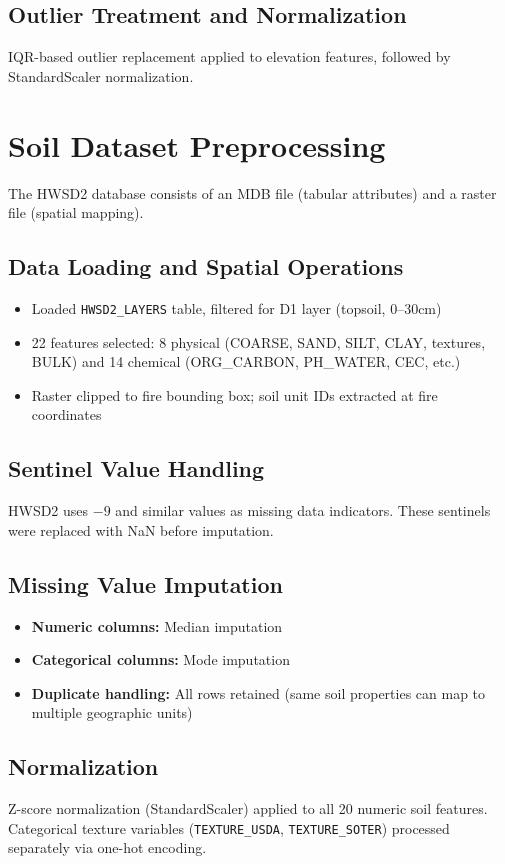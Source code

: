 \subsection{Outlier Treatment and Normalization}
IQR-based outlier replacement applied to elevation features, followed by StandardScaler normalization.

\section{Soil Dataset Preprocessing}

The HWSD2 database consists of an MDB file (tabular attributes) and a raster file (spatial mapping).

\subsection{Data Loading and Spatial Operations}
\begin{itemize}
    \item Loaded \texttt{HWSD2\_LAYERS} table, filtered for D1 layer (topsoil, 0--30cm)
    \item 22 features selected: 8 physical (COARSE, SAND, SILT, CLAY, textures, BULK) and 14 chemical (ORG\_CARBON, PH\_WATER, CEC, etc.)
    \item Raster clipped to fire bounding box; soil unit IDs extracted at fire coordinates
\end{itemize}

\subsection{Sentinel Value Handling}
HWSD2 uses $-9$ and similar values as missing data indicators. These sentinels were replaced with NaN before imputation.

\subsection{Missing Value Imputation}
\begin{itemize}
    \item \textbf{Numeric columns:} Median imputation
    \item \textbf{Categorical columns:} Mode imputation
    \item \textbf{Duplicate handling:} All rows retained (same soil properties can map to multiple geographic units)
\end{itemize}

\subsection{Normalization}
Z-score normalization (StandardScaler) applied to all 20 numeric soil features. Categorical texture variables (\texttt{TEXTURE\_USDA}, \texttt{TEXTURE\_SOTER}) processed separately via one-hot encoding.


